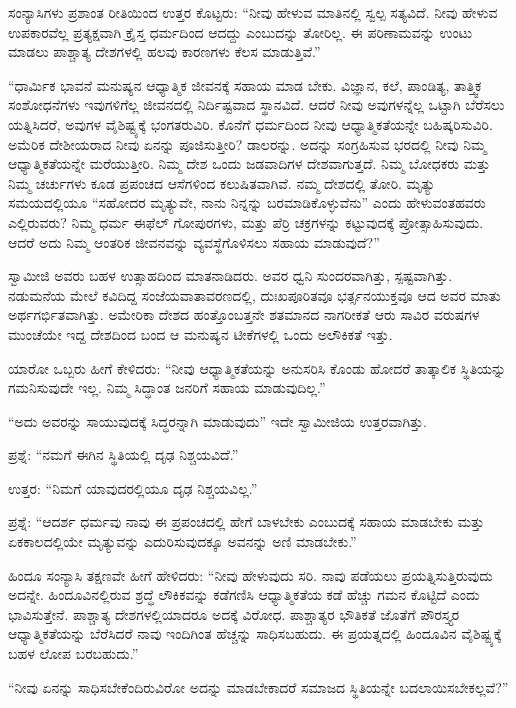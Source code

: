 ಸಂನ್ಯಾಸಿಗಳು ಪ್ರಶಾಂತ ರೀತಿಯಿಂದ ಉತ್ತರ ಕೊಟ್ಟರು: “ನೀವು ಹೇಳುವ ಮಾತಿನಲ್ಲಿ ಸ್ವಲ್ಪ ಸತ್ಯವಿದೆ. ನೀವು ಹೇಳುವ ಉಪಕಾರವೆಲ್ಲ ಪ್ರತ್ಯಕ್ಷವಾಗಿ ಕ್ರೈಸ್ತ ಧರ್ಮದಿಂದ ಆದದ್ದು ಎಂಬುದನ್ನು ತೋರಿಲ್ಲ. ಈ ಪರಿಣಾಮವನ್ನು ಉಂಟು ಮಾಡಲು ಪಾಶ್ಚಾತ್ಯ ದೇಶಗಳಲ್ಲಿ ಹಲವು ಕಾರಣಗಳು ಕೆಲಸ ಮಾಡುತ್ತಿವೆ.”

“ಧಾರ್ಮಿಕ ಭಾವನೆ ಮನುಷ್ಯನ ಆಧ್ಯಾತ್ಮಿಕ ಜೀವನಕ್ಕೆ ಸಹಾಯ ಮಾಡ ಬೇಕು. ವಿಜ್ಞಾನ, ಕಲೆ, ಪಾಂಡಿತ್ಯ, ತಾತ್ತ್ವಿಕ ಸಂಶೋಧನೆಗಳು ಇವುಗಳಿಗೆಲ್ಲ ಜೀವನದಲ್ಲಿ ನಿರ್ದಿಷ್ಟವಾದ ಸ್ಥಾನವಿದೆ. ಆದರೆ ನೀವು ಅವುಗಳನ್ನೆಲ್ಲ ಒಟ್ಟಾಗಿ ಬೆರೆಸಲು ಯತ್ನಿಸಿದರೆ, ಅವುಗಳ ವೈಶಿಷ್ಟ್ಯಕ್ಕೆ ಭಂಗತರುವಿರಿ. ಕೊನೆಗೆ ಧರ್ಮದಿಂದ ನೀವು ಆಧ್ಯಾತ್ಮಿಕತೆಯನ್ನೇ ಬಹಿಷ್ಕರಿಸುವಿರಿ. ಅಮೆರಿಕ ದೇಶೀಯರಾದ ನೀವು ಏನನ್ನು ಪೂಜಿಸುತ್ತೀರಿ? ಡಾಲರನ್ನು. ಅದನ್ನು ಸಂಗ್ರಹಿಸುವ ಭರದಲ್ಲಿ ನೀವು ನಿಮ್ಮ ಆಧ್ಯಾತ್ಮಿಕತೆಯನ್ನೇ ಮರೆಯುತ್ತೀರಿ. ನಿಮ್ಮ ದೇಶ ಒಂದು ಜಡವಾದಿಗಳ ದೇಶವಾಗುತ್ತದೆ. ನಿಮ್ಮ ಬೋಧಕರು ಮತ್ತು ನಿಮ್ಮ ಚರ್ಚುಗಳು ಕೂಡ ಪ್ರಪಂಚದ ಆಸೆಗಳಿಂದ ಕಲುಷಿತವಾಗಿವೆ. ನಮ್ಮ ದೇಶದಲ್ಲಿ ತೋರಿ. ಮೃತ್ಯು ಸಮಯದಲ್ಲಿಯೂ “ಸಹೋದರ ಮೃತ್ಯುವೇ, ನಾನು ನಿನ್ನನ್ನು ಬರಮಾಡಿಕೊಳ್ಳುವೆನು” ಎಂದು ಹೇಳುವಂತಹವರು ಎಲ್ಲಿರುವರು? ನಿಮ್ಮ ಧರ್ಮ ಈಫೆಲ್​ ಗೋಪುರಗಳು, ಮತ್ತು ಪೆರ್ರಿ ಚಕ್ರಗಳನ್ನು ಕಟ್ಟುವುದಕ್ಕೆ ಪ್ರೋತ್ಸಾಹಿಸುವುದು. ಆದರೆ ಅದು ನಿಮ್ಮ ಆಂತರಿಕ ಜೀವನವನ್ನು ವ್ಯವಸ್ಥೆಗೊಳಿಸಲು ಸಹಾಯ ಮಾಡುವುದೆ?”

ಸ್ವಾಮೀಜಿ ಅವರು ಬಹಳ ಉತ್ಸಾಹದಿಂದ ಮಾತನಾಡಿದರು. ಅವರ ಧ್ವನಿ ಸುಂದರವಾಗಿತ್ತು, ಸ್ಪಷ್ಟವಾಗಿತ್ತು. ನಡುಮನೆಯ ಮೇಲೆ ಕವಿದಿದ್ದ ಸಂಜೆಯವಾತಾವರಣದಲ್ಲಿ, ದುಃಖಪೂರಿತವೂ ಭರ್ತ್ಸನಯುಕ್ತವೂ ಆದ ಅವರ ಮಾತು ಅರ್ಥಗರ್ಭಿತವಾಗಿತ್ತು. ಅಮೇರಿಕಾ ದೇಶದ ಹಂತ್ತೊಂಬತ್ತನೇ ಶತಮಾನದ ನಾಗರೀಕತೆ ಆರು ಸಾವಿರ ವರುಷಗಳ ಮುಂಚೆಯೇ ಇದ್ದ ದೇಶದಿಂದ ಬಂದ ಆ ಮನುಷ್ಯನ ಟೀಕೆಗಳಲ್ಲಿ ಒಂದು ಅಲೌಕಿಕತೆ ಇತ್ತು.

ಯಾರೋ ಒಬ್ಬರು ಹೀಗೆ ಕೇಳಿದರು: “ನೀವು ಆಧ್ಯಾತ್ಮಿಕತೆಯನ್ನು ಅನುಸರಿಸಿ ಕೊಂಡು ಹೋದರೆ ತಾತ್ಕಾಲಿಕ ಸ್ಥಿತಿಯನ್ನು ಗಮನಿಸುವುದೇ ಇಲ್ಲ. ನಿಮ್ಮ ಸಿದ್ಧಾಂತ ಜನರಿಗೆ ಸಹಾಯ ಮಾಡುವುದಿಲ್ಲ.”

“ಅದು ಅವರನ್ನು ಸಾಯುವುದಕ್ಕೆ ಸಿದ್ಧರನ್ನಾಗಿ ಮಾಡುವುದು” ಇದೇ ಸ್ವಾಮೀಜಿಯ ಉತ್ತರವಾಗಿತ್ತು.

ಪ್ರಶ್ನೆ: “ನಮಗೆ ಈಗಿನ ಸ್ಥಿತಿಯಲ್ಲಿ ದೃಢ ನಿಶ್ಚಯವಿದೆ.”

ಉತ್ತರ: “ನಿಮಗೆ ಯಾವುದರಲ್ಲಿಯೂ ದೃಢ ನಿಶ್ಚಯವಿಲ್ಲ.”

ಪ್ರಶ್ನೆ: “ಆದರ್ಶ ಧರ್ಮವು ನಾವು ಈ ಪ್ರಪಂಚದಲ್ಲಿ ಹೇಗೆ ಬಾಳಬೇಕು ಎಂಬುದಕ್ಕೆ ಸಹಾಯ ಮಾಡಬೇಕು ಮತ್ತು ಏಕಕಾಲದಲ್ಲಿಯೇ ಮೃತ್ಯುವನ್ನು ಎದುರಿಸುವುದಕ್ಕೂ ಅವನನ್ನು ಅಣಿ ಮಾಡಬೇಕು.”

ಹಿಂದೂ ಸಂನ್ಯಾಸಿ ತಕ್ಷಣವೇ ಹೀಗೆ ಹೇಳಿದರು: “ನೀವು ಹೇಳುವುದು ಸರಿ. ನಾವು ಪಡೆಯಲು ಪ್ರಯತ್ನಿಸುತ್ತಿರುವುದು ಅದನ್ನೇ. ಹಿಂದೂವಿನಲ್ಲಿರುವ ಶ್ರದ್ಧೆ ಲೌಕಿಕವನ್ನು ಕಡೆಗಣಿಸಿ ಆಧ್ಯಾತ್ಮಿಕತೆಯ ಕಡೆ ಹೆಚ್ಚು ಗಮನ ಕೊಟ್ಟಿದೆ ಎಂದು ಭಾವಿಸುತ್ತೇನೆ. ಪಾಶ್ಚಾತ್ಯ ದೇಶಗಳಲ್ಲಿಯಾದರೂ ಅದಕ್ಕೆ ವಿರೋಧ. ಪಾಶ್ಚಾತ್ಯರ ಭೌತಿಕತೆ ಜೊತೆಗೆ ಪೌರಸ್ತ್ಯರ ಆಧ್ಯಾತ್ಮಿಕತೆಯನ್ನು ಬೆರೆಸಿದರೆ ನಾವು ಇಂದಿಗಿಂತ ಹೆಚ್ಚನ್ನು ಸಾಧಿಸಬಹುದು. ಈ ಪ್ರಯತ್ನದಲ್ಲಿ ಹಿಂದೂವಿನ ವೈಶಿಷ್ಟ್ಯಕ್ಕೆ ಬಹಳ ಲೋಪ ಬರಬಹುದು.”

“ನೀವು ಏನನ್ನು ಸಾಧಿಸಬೇಕೆಂದಿರುವಿರೋ ಅದನ್ನು ಮಾಡಬೇಕಾದರೆ ಸಮಾಜದ ಸ್ಥಿತಿಯನ್ನೇ ಬದಲಾಯಿಸಬೇಕಲ್ಲವೆ?”


